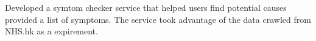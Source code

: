 \begin{cventry}
  \item Developed a symtom checker service that helped users find potential causes provided a list of symptoms. The service took advantage of the data crawled from NHS.hk as a expirement.
\end{cventry}
